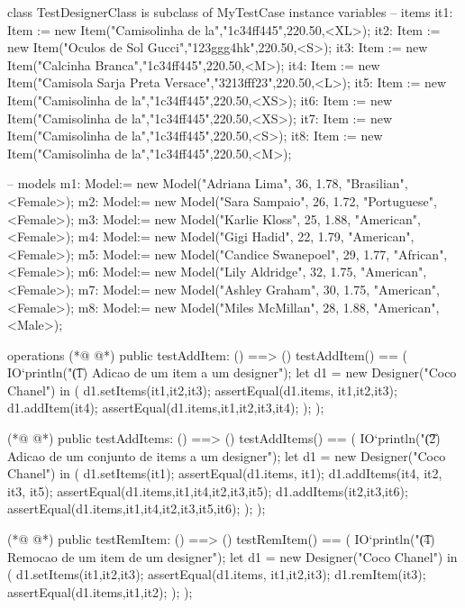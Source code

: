\begin{vdmpp}[breaklines=true]
class TestDesignerClass is subclass of MyTestCase
instance variables
 -- items
 it1: Item := new Item("Camisolinha de la","1c34ff445",220.50,<XL>);
 it2: Item := new Item("Oculos de Sol Gucci","123ggg4hk",220.50,<S>);
 it3: Item := new Item("Calcinha Branca","1c34ff445",220.50,<M>);
 it4: Item := new Item("Camisola Sarja Preta Versace","3213fff23",220.50,<L>);
 it5: Item := new Item("Camisolinha de la","1c34ff445",220.50,<XS>);
 it6: Item := new Item("Camisolinha de la","1c34ff445",220.50,<XS>);
 it7: Item := new Item("Camisolinha de la","1c34ff445",220.50,<S>);
 it8: Item := new Item("Camisolinha de la","1c34ff445",220.50,<M>);
 
 -- models
 m1: Model:= new Model("Adriana Lima", 36, 1.78, "Brasilian", <Female>);
 m2: Model:= new Model("Sara Sampaio", 26, 1.72, "Portuguese", <Female>);
 m3: Model:= new Model("Karlie Kloss", 25, 1.88, "American", <Female>);
 m4: Model:= new Model("Gigi Hadid", 22, 1.79, "American", <Female>);
 m5: Model:= new Model("Candice Swanepoel", 29, 1.77, "African", <Female>);
 m6: Model:= new Model("Lily Aldridge", 32, 1.75, "American", <Female>);
 m7: Model:= new Model("Ashley Graham", 30, 1.75, "American", <Female>);
 m8: Model:= new Model("Miles McMillan", 28, 1.88, "American", <Male>);

operations 
(*@
\label{testAddItem:24}
@*)
 public testAddItem: () ==> ()
 testAddItem() == (
  IO`println("\t (1) Adicao de um item a um designer");
   let d1 = new Designer("Coco Chanel") in (
    d1.setItems({it1,it2,it3});
    assertEqual(d1.items, {it1,it2,it3});
    d1.addItem(it4);
    assertEqual(d1.items,{it1,it2,it3,it4});
  );
 );
 
(*@
\label{testAddItems:35}
@*)
 public testAddItems: () ==> ()
 testAddItems() == (
  IO`println("\t (2) Adicao de um conjunto de items a um designer");
   let d1 = new Designer("Coco Chanel") in (
    d1.setItems({it1});
    assertEqual(d1.items, {it1});
    d1.addItems({it4, it2, it3, it5});
    assertEqual(d1.items,{it1,it4,it2,it3,it5});
    d1.addItems({it2,it3,it6});
    assertEqual(d1.items,{it1,it4,it2,it3,it5,it6});
  );
 );
 
(*@
\label{testRemItem:48}
@*)
 public testRemItem: () ==> ()
 testRemItem() == (
  IO`println("\t (4) Remocao de um item de um designer");
   let d1 = new Designer("Coco Chanel") in (
    d1.setItems({it1,it2,it3});
    assertEqual(d1.items, {it1,it2,it3});
    d1.remItem(it3);
    assertEqual(d1.items,{it1,it2});    
  );
 );
 

\end{vdmpp}
